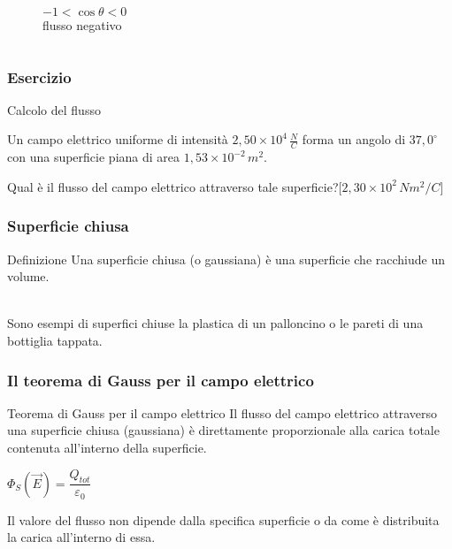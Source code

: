 \documentclass[handout]{beamer}
\theoremstyle{plain}
\begin{document}
\begin{frame}
\begin{columns}
\begin{column}{0.5\textwidth}
\begin{figure}
$ -1 < \cos\theta < 0 $\\flusso negativo
\end{figure}
\end{column}
\end{columns}
\end{frame}



\begin{frame}
\frametitle{Esercizio}

\begin{exampleblock}{Calcolo del flusso}
{\small Un campo elettrico uniforme di intensità $ 2,50 \times 10^4 \, \frac{N}{C} $ forma un angolo di $ 37,0^\circ $ con una superficie piana di area $ 1,53 \times 10^{-2} \, m^2 $.

Qual è il flusso del campo elettrico attraverso tale superficie?\hspace*{\fill}[$ 2,30 \times 10^{2} \, Nm^2/C $]}
\end{exampleblock}
\end{frame}



\begin{frame}
  \frametitle{Superficie chiusa}
  \begin{block}{Definizione}
    Una superficie chiusa (o gaussiana) è una superficie che racchiude un volume.
  \end{block}\pause~\\
  Sono esempi di superfici chiuse la plastica di un palloncino o le pareti di una bottiglia tappata.
\end{frame}






\begin{frame}
  \frametitle{Il teorema di Gauss per il campo elettrico}
  \begin{block}{Teorema di Gauss per il campo elettrico}
    Il flusso del campo elettrico attraverso una superficie chiusa (gaussiana) è direttamente proporzionale alla carica totale contenuta all'interno della superficie.
    \begin{center}
   \colorbox{blue!30}{$ \Phi_S (\vec{E}) = \dfrac{Q_{tot}}{\varepsilon_0} $}
   \end{center}
  \end{block}\pause
  Il valore del flusso non dipende dalla specifica superficie o da come è distribuita la carica all'interno di essa.
\end{frame}
\end{document}
